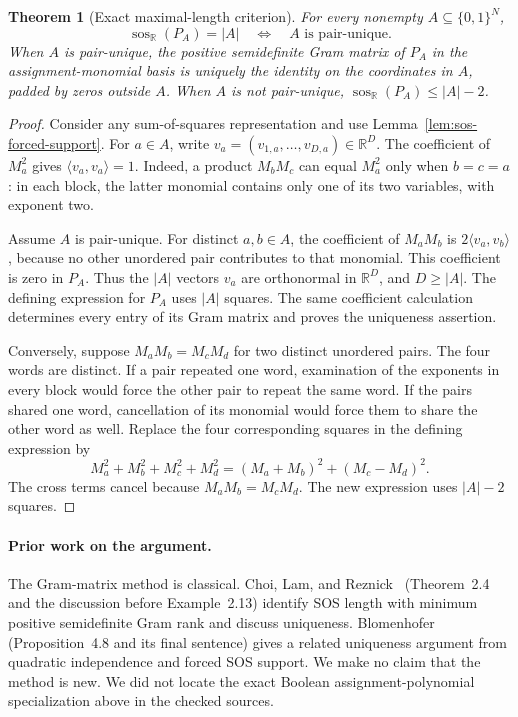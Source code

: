 \documentclass[11pt]{article}
\newtheorem{theorem}{Theorem}[section]
\theoremstyle{definition}
\theoremstyle{remark}
\begin{document}
\begin{theorem}[Exact maximal-length criterion]
\label{thm:sos-exact-criterion}
For every nonempty $A\subseteq\{0,1\}^N$,
\[
 \operatorname{sos}_{\mathbb R}(P_A)=|A|
 \quad\Longleftrightarrow\quad A\text{ is pair-unique}.
\]
When $A$ is pair-unique, the positive semidefinite Gram matrix of
$P_A$ in the assignment-monomial basis is uniquely the identity on
the coordinates in $A$, padded by zeros outside $A$.
When $A$ is not pair-unique,
$\operatorname{sos}_{\mathbb R}(P_A)\le |A|-2$.
\end{theorem}
\begin{proof}
Consider any sum-of-squares representation and use
Lemma~\ref{lem:sos-forced-support}.  For $a\in A$, write
$v_a=(v_{1,a},\ldots,v_{D,a})\in\mathbb R^D$.
The coefficient of $M_a^2$ gives $\langle v_a,v_a\rangle=1$.
Indeed, a product $M_bM_c$ can equal $M_a^2$ only when $b=c=a$:
in each block, the latter monomial contains only one of its two
variables, with exponent two.

Assume $A$ is pair-unique.  For distinct $a,b\in A$, the coefficient
of $M_aM_b$ is $2\langle v_a,v_b\rangle$, because no other unordered
pair contributes to that monomial.  This coefficient is zero in $P_A$.
Thus the $|A|$ vectors $v_a$ are orthonormal in $\mathbb R^D$, and
$D\ge |A|$.  The defining expression for $P_A$ uses $|A|$ squares.
The same coefficient calculation determines every entry of its Gram
matrix and proves the uniqueness assertion.

Conversely, suppose $M_aM_b=M_cM_d$ for two distinct unordered pairs.
The four words are distinct.  If a pair repeated one word, examination
of the exponents in every block would force the other pair to repeat
the same word.  If the pairs shared one word, cancellation of its
monomial would force them to share the other word as well.
Replace the four corresponding squares in the defining expression by
\[
 M_a^2+M_b^2+M_c^2+M_d^2
 =(M_a+M_b)^2+(M_c-M_d)^2.
\]
The cross terms cancel because $M_aM_b=M_cM_d$.
The new expression uses $|A|-2$ squares.
\end{proof}

\paragraph{Prior work on the argument.}
The Gram-matrix method is classical. Choi, Lam, and
Reznick~\cite{clr} (Theorem~2.4 and the discussion before
Example~2.13) identify SOS length with minimum positive semidefinite
Gram rank and discuss uniqueness. Blomenhofer~\cite{blomenhofer}
(Proposition~4.8 and its final sentence) gives a related uniqueness
argument from quadratic independence and forced SOS support.
We make no claim that the method is new. We did not locate the exact
Boolean assignment-polynomial specialization above in the checked
sources.
\end{document}
